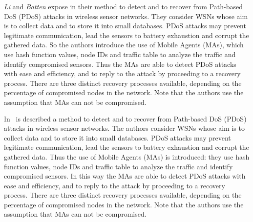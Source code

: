 
\textit{Li} and \textit{Batten} expose in
\cite{LB09}
their method to detect and to recover from Path-based DoS (PDoS) attacks in wireless sensor networks.
They consider WSNs whose aim is to collect data and to store it into small databases.
PDoS attacks may prevent legitimate communication, lead the sensors to battery exhaustion and corrupt the gathered data.
So the authors introduce the use of Mobile Agents (MAs), which use hash function values, node IDs and traffic table to analyze the traffic and identify compromised sensors.
Thus the MAs are able to detect PDoS attacks with ease and efficiency, and to reply to the attack by proceeding to a recovery process.
There are three distinct recovery processes available, depending on the percentage of compromised nodes in the network.
Note that the authors use the assumption that MAs can not be compromised.

In~\cite{LB09} is described a method to detect and to recover from Path-based DoS (PDoS) attacks in wireless sensor networks.
The authors consider WSNs whose aim is to collect data and to store it into small databases.
PDoS attacks may prevent legitimate communication, lead the sensors to battery exhaustion and corrupt the gathered data.
Thus the use of Mobile Agents (MAs) is introduced: they use hash function values, node IDs and traffic table to analyze the traffic and identify compromised sensors.
In this way the MAs are able to detect PDoS attacks with ease and efficiency, and to reply to the attack by proceeding to a recovery process.
There are three distinct recovery processes available, depending on the percentage of compromised nodes in the network.
Note that the authors use the assumption that MAs can not be compromised.

